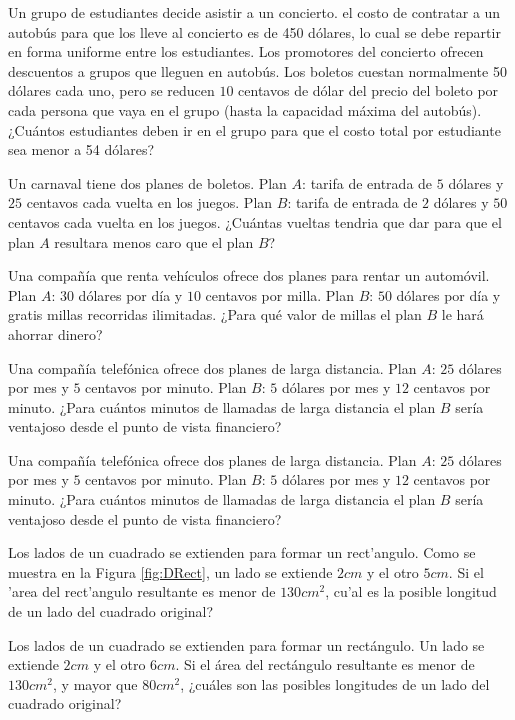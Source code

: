 \documentclass[]{book}
\theoremstyle{definition}
\theoremstyle{definition}
\theoremstyle{definition}
\theoremstyle{remark}
\begin{document}
Un grupo de estudiantes decide asistir a un concierto. el costo de contratar a un autobús para que los lleve al concierto es de 450 dólares, lo cual se debe repartir en forma uniforme entre los estudiantes. Los promotores del concierto ofrecen descuentos a grupos que lleguen en autobús. Los boletos cuestan normalmente 50 dólares cada uno, pero se reducen \(10\) centavos de dólar del precio del boleto por cada persona que vaya en el grupo (hasta la capacidad máxima del autobús).¿Cuántos estudiantes deben ir en el grupo para que el costo total por estudiante sea menor a 54 dólares?

Un carnaval tiene dos planes de boletos.
Plan \(A\): tarifa de entrada de \(5\) dólares y \(25\) centavos cada vuelta en los juegos.
Plan \(B\): tarifa de entrada de \(2\) dólares y \(50\) centavos cada vuelta en los juegos.
¿Cuántas vueltas tendria que dar para que el plan \(A\) resultara menos caro que el plan \(B\)?

Una compañía que renta vehículos ofrece dos planes para rentar un automóvil. Plan \(A\): \(30\) dólares por día y \(10\) centavos por milla. Plan \(B\): \(50\) dólares por día y gratis millas recorridas ilimitadas. ¿Para qué valor de millas el plan \(B\) le hará ahorrar dinero?

Una compañía telefónica ofrece dos planes de larga distancia. Plan \(A\): \(25\) dólares por mes y \(5\) centavos por minuto. Plan \(B\): \(5\) dólares por mes y \(12\) centavos por minuto. ¿Para cuántos minutos de llamadas de larga distancia el plan \(B\) sería ventajoso desde el punto de vista financiero?

Una compañía telefónica ofrece dos planes de larga distancia. Plan \(A\): \(25\) dólares por mes y \(5\) centavos por minuto. Plan \(B\): \(5\) dólares por mes y \(12\) centavos por minuto. ¿Para cuántos minutos de llamadas de larga distancia el plan \(B\) sería ventajoso desde el punto de vista financiero?

Los lados de un cuadrado se extienden para formar un rect'angulo. Como se muestra en la Figura \ref{fig:DRect}, un lado se extiende \(2 cm\) y el otro \(5 cm\). Si el 'area del rect'angulo resultante es menor de \(130 cm^2\), cu'al es la posible longitud de un lado del cuadrado original?

Los lados de un cuadrado se extienden para formar un rectángulo. Un lado se extiende \(2 cm\) y el otro \(6 cm\). Si el área del rectángulo resultante es menor de \(130 cm^2\), y mayor que \(80 cm^2\), ¿cuáles son las posibles longitudes de un lado del cuadrado original?
\end{document}
